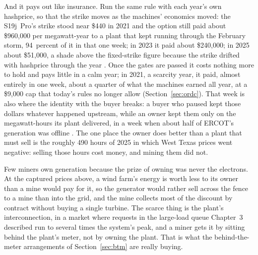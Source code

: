 And it pays out like insurance. Run the same rule with each year's own hashprice, so that the strike moves as the machines' economics moved: the S19j~Pro's strike stood near \$440 in 2021 and the option still paid about \$960,000 per megawatt-year to a plant that kept running through the February storm, 94~percent of it in that one week; in 2023 it paid about \$240,000; in 2025 about \$51,000, a shade above the fixed-strike figure because the strike drifted with hashprice through the year \autocite{ercotrtmhist}. %
Once the gates are passed it costs nothing more to hold and pays little in a calm year; in 2021, a scarcity year, it paid, almost entirely in one week, about a quarter of what the machines earned all year, at a \$9,000 cap that today's rules no longer allow (Section~\ref{sec:ordc}). %
That week is also where the identity with the buyer breaks: a buyer who paused kept those dollars whatever happened upstream, while an owner kept them only on the megawatt-hours its plant delivered, in a week when about half of ERCOT's generation was offline \autocite{ERCOTUpdate2021}. %
The one place the owner does better than a plant that must sell is the roughly 490 hours of 2025 in which West Texas prices went negative: selling those hours cost money, and mining them did not. %

Few miners own generation because the prize of owning was never the electrons. At the captured prices above, a wind farm's energy is worth less to its owner than a mine would pay for it, so the generator would rather sell across the fence to a mine than into the grid, and the mine collects most of the discount by contract without buying a single turbine. The scarce thing is the plant's interconnection, in a market where requests in the large-load queue Chapter~3 described run to several times the system's peak, and a miner gets it by sitting behind the plant's meter, not by owning the plant. That is what the behind-the-meter arrangements of Section~\ref{sec:btm} are really buying.

